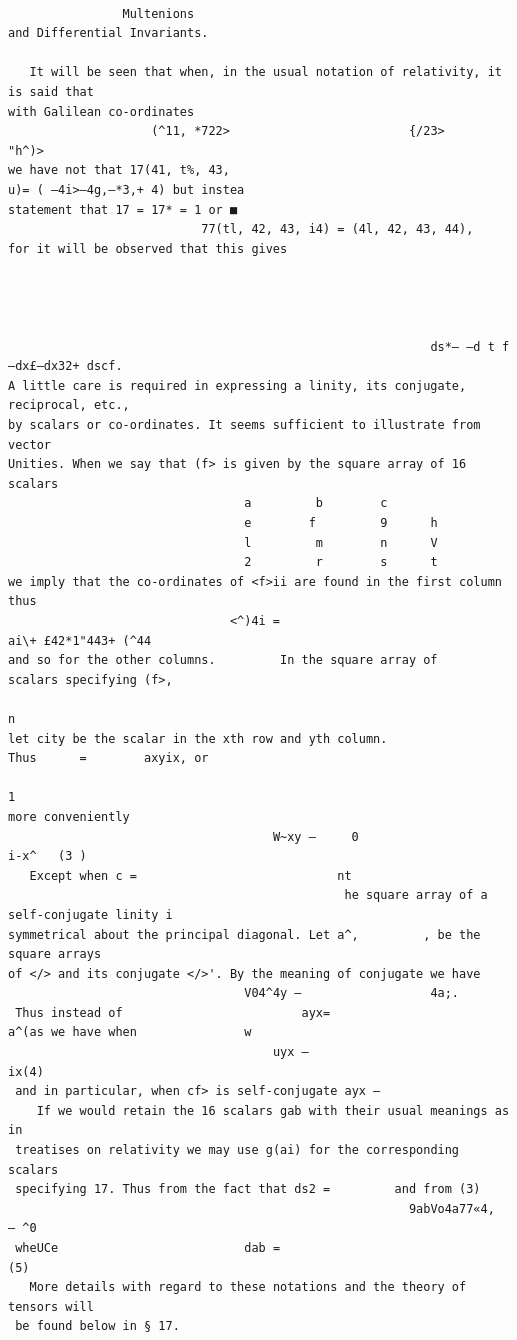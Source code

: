 \documentclass[10pt]{article}
\begin{document}
\clearpage
\begin{verbatim}

                Multenions                                               and Differential Invariants.

   It will be seen that when, in the usual notation of relativity, it is said that
with Galilean co-ordinates
                    (^11, *722>                         {/23>     "h^)>
we have not that 17(41, t%, 43,                                       u)= ( —4i>—4g,—*3,+ 4) but instea
statement that 17 = 17* = 1 or ■
                           77(tl, 42, 43, i4) = (4l, 42, 43, 44),
for it will be observed that this gives




                                                           ds*— —d t f —dx£—dx32+ dscf.
A little care is required in expressing a linity, its conjugate, reciprocal, etc.,
by scalars or co-ordinates. It seems sufficient to illustrate from vector
Unities. When we say that (f> is given by the square array of 16 scalars
                                 a         b        c
                                 e        f         9      h
                                 l         m        n      V
                                 2         r        s      t
we imply that the co-ordinates of <f>ii are found in the first column thus
                               <^)4i =                                               ai\+ £42*1"443+ (^44
and so for the other columns.         In the square array of             scalars specifying (f>,
                                                                                     n
let city be the scalar in the xth row and yth column.                  Thus      =        axyix, or
                                                                                         1
more conveniently
                                     W~xy —     0                                                 i-x^   (3 )
   Except when c =                            nt
                                               he square array of a self-conjugate linity i
symmetrical about the principal diagonal. Let a^,         , be the square arrays
of </> and its conjugate </>'. By the meaning of conjugate we have
                                 V04^4y —                  4a;.
 Thus instead of                         ayx=                                  a^(as we have when               w
                                     uyx —                                                       ix(4)
 and in particular, when cf> is self-conjugate ayx —
    If we would retain the 16 scalars gab with their usual meanings as in
 treatises on relativity we may use g(ai) for the corresponding scalars
 specifying 17. Thus from the fact that ds2 =         and from (3)
                                                        9abVo4a77«4,          — ^0
 wheUCe                          dab =                                   (5)
   More details with regard to these notations and the theory of tensors will
 be found below in § 17.


\end{verbatim}
\end{document}
